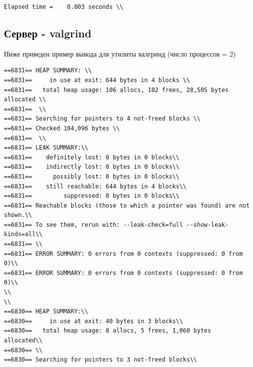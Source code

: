 \documentclass[a4paper,12pt]{report}
\begin{document}
\begin{verbatim}
Elapsed time =    0.003 seconds \\

\end{verbatim}
\subsection*{Сервер - valgrind}
Ниже приведен пример вывода для утилиты валгринд (число процессов = 2) \\

\begin{verbatim}
==6831== HEAP SUMMARY: \\
==6831==     in use at exit: 644 bytes in 4 blocks \\
==6831==   total heap usage: 106 allocs, 102 frees, 28,505 bytes allocated \\
==6831==  \\
==6831== Searching for pointers to 4 not-freed blocks \\
==6831== Checked 104,096 bytes \\
==6831==  \\
==6831== LEAK SUMMARY:\\
==6831==    definitely lost: 0 bytes in 0 blocks\\
==6831==    indirectly lost: 0 bytes in 0 blocks\\
==6831==      possibly lost: 0 bytes in 0 blocks\\
==6831==    still reachable: 644 bytes in 4 blocks\\
==6831==         suppressed: 0 bytes in 0 blocks\\
==6831== Reachable blocks (those to which a pointer was found) are not shown.\\
==6831== To see them, rerun with: --leak-check=full --show-leak-kinds=all\\
==6831== \\
==6831== ERROR SUMMARY: 0 errors from 0 contexts (suppressed: 0 from 0)\\
==6831== ERROR SUMMARY: 0 errors from 0 contexts (suppressed: 0 from 0)\\
\\
\\
==6830== HEAP SUMMARY:\\
==6830==     in use at exit: 40 bytes in 3 blocks\\
==6830==   total heap usage: 8 allocs, 5 frees, 1,060 bytes allocated\\
==6830== \\
==6830== Searching for pointers to 3 not-freed blocks\\

\end{verbatim}
\end{document}
